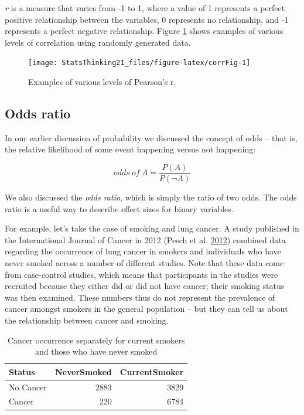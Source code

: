 \documentclass[12pt,]{book}
\begin{document}
\emph{r} is a measure that varies from -1 to 1, where a value of 1 represents a perfect positive relationship between the variables, 0 represents no relationship, and -1 represents a perfect negative relationship. Figure \ref{fig:corrFig} shows examples of various levels of correlation using randomly generated data.

\begin{figure}
\texttt{[image: StatsThinking21\_files/figure-latex/corrFig-1]} \caption{Examples of various levels of Pearson's r.}\label{fig:corrFig}
\end{figure}

\hypertarget{odds-ratio}{%
\subsection{Odds ratio}\label{odds-ratio}}

In our earlier discussion of probability we discussed the concept of odds -- that is, the relative likelihood of some event happening versus not happening:

\[
odds\ of\ A = \frac{P(A)}{P(\neg A)}
\]

We also discussed the \emph{odds ratio}, which is simply the ratio of two odds. The odds ratio is a useful way to describe effect sizes for binary variables.

For example, let's take the case of smoking and lung cancer. A study published in the International Journal of Cancer in 2012 (Pesch et al. \protect\hyperlink{ref-pesc:kend:gust:2012}{2012}) combined data regarding the occurrence of lung cancer in smokers and individuals who have never smoked across a number of different studies. Note that these data come from case-control studies, which means that participants in the studies were recruited because they either did or did not have cancer; their smoking status was then examined. These numbers thus do not represent the prevalence of cancer amongst smokers in the general population -- but they can tell us about the relationship between cancer and smoking.

\begin{table}

\caption{\label{tab:unnamed-chunk-127}Cancer occurrence separately for current smokers and those who have never smoked}
\centering
\begin{tabular}[t]{l|r|r}
\hline
Status & NeverSmoked & CurrentSmoker\\
\hline
No Cancer & 2883 & 3829\\
\hline
Cancer & 220 & 6784\\
\hline
\end{tabular}
\end{table}
\end{document}
